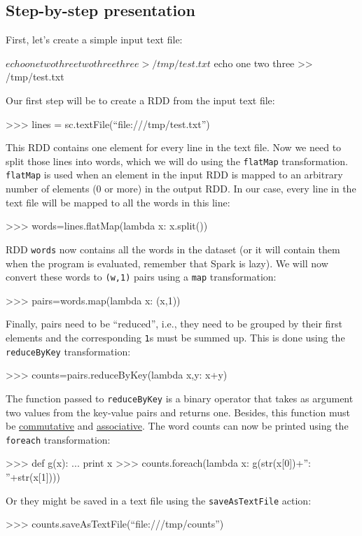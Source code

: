\documentclass[11pt]{article}
\begin{document}
\subsection{Step-by-step presentation}

First, let's create a simple input text file:
\begin{cli}
  $ echo one two three two three three > /tmp/test.txt
  $ echo one two three >> /tmp/test.txt
\end{cli}
Our first step will be to create a RDD from the input text file:
\begin{cli}
  >>> lines = sc.textFile(``file:///tmp/test.txt'')
\end{cli}
This RDD contains one element for every line in the text file.  Now we
need to split those lines into words, which we will do using the
\texttt{flatMap} transformation.  \texttt{flatMap} is used when an
element in the input RDD is mapped to an arbitrary number of elements
(0 or more) in the output RDD. In our case, every line in the text
file will be mapped to all the words in this line:
\begin{cli}
  >>> words=lines.flatMap(lambda x: x.split())
\end{cli}
RDD \texttt{words} now contains all the words in the dataset (or it
will contain them when the program is evaluated, remember that Spark
is lazy). We will now convert these words to \texttt{(w,1)} pairs using a
\texttt{map} transformation:
\begin{cli}
  >>> pairs=words.map(lambda x: (x,1))
\end{cli}
Finally, pairs need to be ``reduced'', i.e., they need to be grouped
by their first elements and the corresponding \texttt{1}s must be
summed up. This is done using the \texttt{reduceByKey} transformation:
\begin{cli}
  >>> counts=pairs.reduceByKey(lambda x,y: x+y)
\end{cli}
The function passed to \texttt{reduceByKey} is a binary
operator that takes as argument two values from the key-value pairs
and returns one. Besides, this function must be
\underline{commutative} and \underline{associative}. 
The word counts can now be printed using the \texttt{foreach} transformation:
\begin{cli}
  >>> def g(x):
  ...   print x
  >>> counts.foreach(lambda x: g(str(x[0])+'': ''+str(x[1])))
\end{cli}
Or they might be saved in a text file using the \texttt{saveAsTextFile} action:
\begin{cli}
  >>> counts.saveAsTextFile(``file:///tmp/counts'')
\end{cli}
\end{document}
